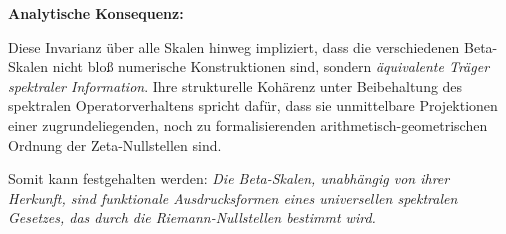 \documentclass[12pt]{article}
\begin{document}
\bigskip
\textbf{Analytische Konsequenz:}

Diese Invarianz über alle Skalen hinweg impliziert, dass die verschiedenen Beta-Skalen nicht bloß numerische Konstruktionen sind, sondern \emph{äquivalente Träger spektraler Information}. Ihre strukturelle Kohärenz unter Beibehaltung des spektralen Operatorverhaltens spricht dafür, dass sie unmittelbare Projektionen einer zugrundeliegenden, noch zu formalisierenden arithmetisch-geometrischen Ordnung der Zeta-Nullstellen sind.

\bigskip
Somit kann festgehalten werden: \emph{Die Beta-Skalen, unabhängig von ihrer Herkunft, sind funktionale Ausdrucksformen eines universellen spektralen Gesetzes, das durch die Riemann-Nullstellen bestimmt wird.}
\end{document}
